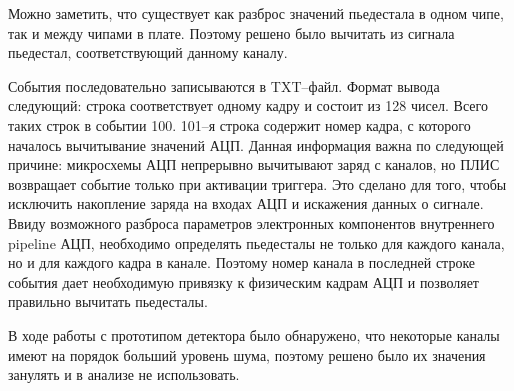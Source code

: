 Можно заметить, что существует как разброс значений пьедестала в одном чипе, так и между чипами в плате. Поэтому решено было вычитать из сигнала пьедестал, соответствующий данному каналу.
\par События последовательно записываются в TXT--файл. Формат вывода следующий: строка соответствует одному кадру и состоит из 128 чисел. Всего таких строк в событии 100. 101--я строка содержит номер кадра, с которого началось вычитывание значений АЦП. Данная информация важна по следующей причине: микросхемы АЦП непрерывно вычитывают заряд с каналов, но ПЛИС возвращает событие только при активации триггера. Это сделано для того, чтобы исключить накопление заряда на входах АЦП и искажения данных о сигнале. Ввиду возможного разброса параметров электронных компонентов внутреннего pipeline АЦП, необходимо определять пьедесталы не только для каждого канала, но и для каждого кадра в канале. Поэтому номер канала в последней строке события дает необходимую привязку к физическим кадрам АЦП и позволяет правильно вычитать пьедесталы.
\par В ходе работы с прототипом детектора было обнаружено, что некоторые каналы имеют на порядок больший уровень шума, поэтому решено было их значения занулять и в анализе не использовать. 


